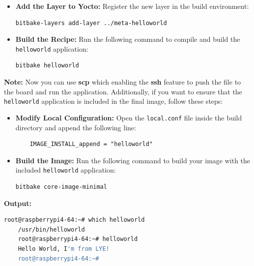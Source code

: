 \documentclass{article}
\begin{document}
\begin{itemize}
    \item \textbf{Add the Layer to Yocto:}  
    Register the new layer in the build environment:
    \begin{lstlisting}[language=bash]
    bitbake-layers add-layer ../meta-helloworld
    \end{lstlisting}

    \item \textbf{Build the Recipe:}  
    Run the following command to compile and build the \texttt{helloworld} application:
    \begin{lstlisting}[language=bash]
    bitbake helloworld
    \end{lstlisting}
\end{itemize}

\textbf{Note:} Now you can use \textbf{scp} which enabling the \textbf{ssh} feature to push the file to the board and run the application. Additionally, if you want to ensure that the \texttt{helloworld} application is included in the final image, follow these steps:

\begin{itemize}
    \item \textbf{Modify Local Configuration:}  
    Open the \texttt{local.conf} file inside the build directory and append the following line:
    \begin{lstlisting}
    IMAGE_INSTALL_append = "helloworld"
    \end{lstlisting}

    \item \textbf{Build the Image:}  
    Run the following command to build your image with the included \texttt{helloworld} application:
    \begin{lstlisting}[language=bash]
    bitbake core-image-minimal
    \end{lstlisting}
\end{itemize}

\textbf{Output:} 
    \begin{lstlisting}[language=bash]
    root@raspberrypi4-64:~# which helloworld
    /usr/bin/helloworld
    root@raspberrypi4-64:~# helloworld
    Hello World, I'm from LYE!
    root@raspberrypi4-64:~#
    \end{lstlisting}
\end{document}
